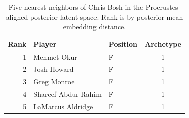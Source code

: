 \begin{table}[htbp]
  \centering\small
  \begin{tabular}{rllc}
    \toprule
    Rank & Player & Position & Archetype \\
    \midrule
    1 & Mehmet Okur & F & 1 \\
    2 & Josh Howard & F & 1 \\
    3 & Greg Monroe & F & 1 \\
    4 & Shareef Abdur-Rahim & F & 1 \\
    5 & LaMarcus Aldridge & F & 1 \\
    \bottomrule
  \end{tabular}
  \caption{Five nearest neighbors of Chris Bosh in the Procrustes-aligned posterior latent space. Rank is by posterior mean embedding distance.}
  \label{tab:Chris_Bosh_neighbors}
\end{table}


